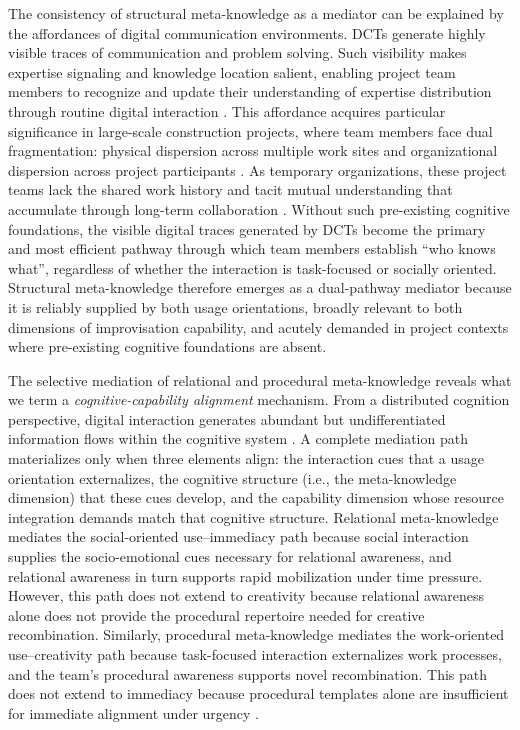 \documentclass[authoryear,preprint,review,times,10pt]{elsarticle}
\begin{document}
The consistency of structural meta-knowledge as a mediator can be explained by the affordances of digital communication environments. DCTs generate highly visible traces of communication and problem solving. Such visibility makes expertise signaling and knowledge location salient, enabling project team members to recognize and update their understanding of expertise distribution through routine digital interaction \citep{chen2020Integrating}. This affordance acquires particular significance in large-scale construction projects, where team members face dual fragmentation: physical dispersion across multiple work sites and organizational dispersion across project participants \citep{shen2022Largescale}. As temporary organizations, these project teams lack the shared work history and tacit mutual understanding that accumulate through long-term collaboration \citep{bakker2010Taking, mariano2024Managing}. Without such pre-existing cognitive foundations, the visible digital traces generated by DCTs become the primary and most efficient pathway through which team members establish ``who knows what'', regardless of whether the interaction is task-focused or socially oriented. Structural meta-knowledge therefore emerges as a dual-pathway mediator because it is reliably supplied by both usage orientations, broadly relevant to both dimensions of improvisation capability, and acutely demanded in project contexts where pre-existing cognitive foundations are absent.

The selective mediation of relational and procedural meta-knowledge reveals what we term a \textit{cognitive-capability alignment} mechanism. From a distributed cognition perspective, digital interaction generates abundant but undifferentiated information flows within the cognitive system \citep{hutchins2020Distributed}. A complete mediation path materializes only when three elements align: the interaction cues that a usage orientation externalizes, the cognitive structure (i.e., the meta-knowledge dimension) that these cues develop, and the capability dimension whose resource integration demands match that cognitive structure. Relational meta-knowledge mediates the social-oriented use--immediacy path because social interaction supplies the socio-emotional cues necessary for relational awareness, and relational awareness in turn supports rapid mobilization under time pressure. However, this path does not extend to creativity because relational awareness alone does not provide the procedural repertoire needed for creative recombination. Similarly, procedural meta-knowledge mediates the work-oriented use--creativity path because task-focused interaction externalizes work processes, and the team's procedural awareness supports novel recombination. This path does not extend to immediacy because procedural templates alone are insufficient for immediate alignment under urgency \citep{ren2011Transactive, marion2021Transformation}.
\end{document}
